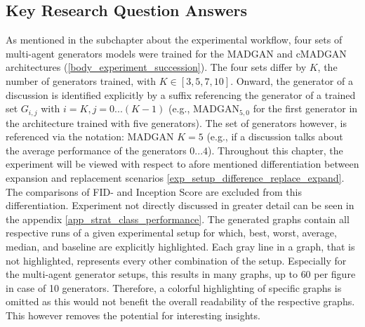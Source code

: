 \subsection{Key Research Question Answers}
As mentioned in the subchapter about the experimental workflow, four sets of multi-agent generators models were trained  for the MADGAN and cMADGAN architectures (\ref{body_experiment_succession}). The four sets differ by \(K\), the number of generators trained, with \(K \in [3, 5, 7, 10]\). Onward, the generator of a discussion is identified explicitly by a suffix referencing the generator of a trained set \(G_{i, j}\) with \(i=K, j=0...(K-1)\) (e.g., \(\text{MADGAN}_{5, 0}\) for the first generator in the architecture trained with five generators). The set of generators however, is referenced via the notation: MADGAN \(K=5\) (e.g., if a discussion talks about the average performance of the generators \(0...4\)). Throughout this chapter, the experiment will be viewed with respect to afore mentioned differentiation between expansion and replacement scenarios \ref{exp_setup_difference_replace_expand}. The comparisons of FID- and Inception Score are excluded from this differentiation. Experiment not directly discussed in greater detail can be seen in the appendix \ref{app_strat_class_performance}.
The generated graphs contain all respective runs of a given experimental setup for which, best, worst, average, median, and baseline are explicitly highlighted. Each gray line in a graph, that is not highlighted, represents every other combination of the setup. Especially for the multi-agent generator setups, this results in many graphs, up to $60$ per figure in case of 10 generators. Therefore, a colorful highlighting of specific graphs is omitted as this would not benefit the overall readability of the respective graphs. This however removes the potential for interesting insights.

\newpage
